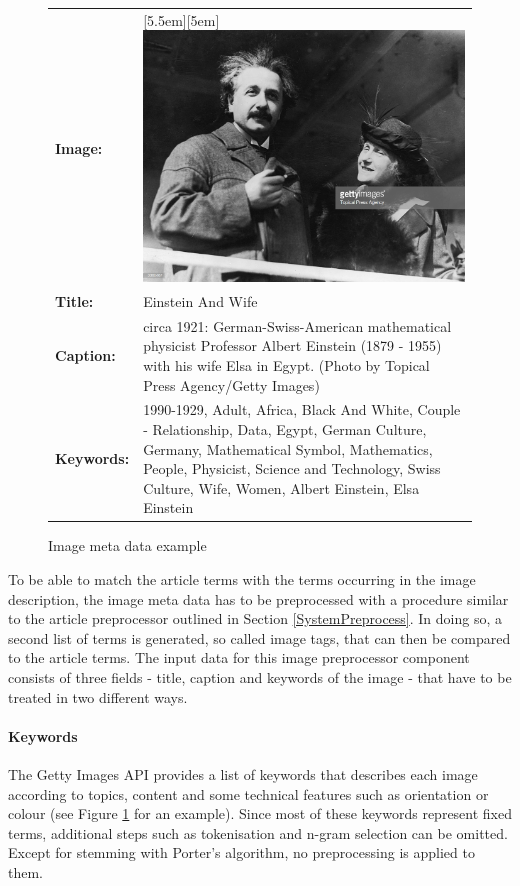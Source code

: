 \documentclass[11pt,a4paper,twoside]{article}
\begin{document}
\begin{figure}[t]
    \caption{Image meta data example}
    \centering
    \def\arraystretch{1.3}
    \begin{tabular}{l p{10cm}}
        \textbf{Image:} & \raisebox{-4.3em}[5.5em][5em]{\includegraphics[width=.3\columnwidth]{einstein.jpg}} \\
        \textbf{Title:} & Einstein And Wife \\
        \textbf{Caption:} & circa 1921:  German-Swiss-American mathematical physicist Professor Albert Einstein (1879 - 1955) with his wife Elsa in Egypt.  (Photo by Topical Press Agency/Getty Images) \\
        \textbf{Keywords:} & \nohyphens{1990-1929, Adult, Africa, Black And White, Couple - Relationship, Data, Egypt, German Culture, Germany, Mathematical Symbol, Mathematics, People, Physicist, Science and Technology, Swiss Culture, Wife, Women, Albert Einstein, Elsa Einstein} \\
    \end{tabular}
    \label{fig:image-meta-example}
\end{figure}

\noindent To be able to match the article terms with the terms occurring in the image description, the image meta data has to be preprocessed with a procedure similar to the article preprocessor outlined in Section \ref{SystemPreprocess}. In doing so, a second list of terms is generated, so called image tags, that can then be compared to the article terms. The input data for this image preprocessor component consists of three fields - title, caption and keywords of the image - that have to be treated in two different ways.

\paragraph{Keywords} The Getty Images API provides a list of keywords that describes each image according to topics, content and some technical features such as orientation or colour (see Figure \ref{fig:image-meta-example} for an example). Since most of these keywords represent fixed terms, additional steps such as tokenisation and n-gram selection can be omitted. Except for stemming with Porter's algorithm, no preprocessing is applied to them.
\end{document}
